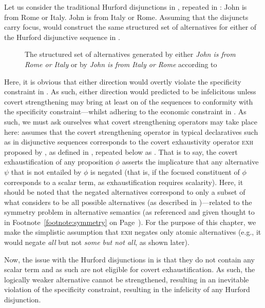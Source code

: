 Let us consider the traditional Hurford disjunctions in , repeated in :
\pex\label{ex:hurford-repeat1}
\a\ljudge{\#}John is from Rome or Italy.
\a\ljudge{\#}John is from Italy or Rome.
\xe
Assuming that the disjuncts carry focus, \textcite{Ippolito2020} would construct the same structured set of alternatives for either of the Hurford disjunctive sequence in .
\begin{figure}[!htb]
    \centering\hspace{-2cm}
    
    \caption{The structured set of alternatives generated by either \textit{John is from Rome or Italy} or by \textit{John is from Italy or Rome} according to \textcite{Ippolito2020}}
\end{figure}
Here, it is obvious that either direction would overtly violate the specificity constraint in . As such, either direction would predicted to be infelicitous unless covert strengthening may bring at least on of the sequences to conformity with the specificity constraint---whilst adhering to the economic constraint in . As such, we must ask ourselves what covert strengthening operators may take place here: \textcite{Ippolito2020} assumes that the covert strengthening operator in typical declaratives such as in disjunctive sequences corresponds to the covert exhaustivity operator {\scshape exh} proposed by \textcite{Chierchia2012}, as defined in , repeated below as .
\ex{}\xe
That is to say, the covert exhaustification of any proposition $\phi$ asserts the implicature that any alternative $\psi$ that is not entailed by $\phi$ is negated (that is, if the focused constituent of $\phi$ corresponds to a scalar term, as exhaustification requires scalarity). Here, it should be noted that the negated alternatives correspond to only a subset of what \textcite{Ippolito2020} considers to be all possible alternatives (as described in )---related to the symmetry problem in alternative semantics (as referenced and given thought to in Footnote~\ref{footnote:symmetry} on Page~\pageref{footnote:symmetry}). For the purpose of this chapter, we make the simplistic assumption that {\scshape exh} negates only atomic alternatives (e.g., it would negate \textit{all} but not \textit{some but not all}, as shown later).

Now, the issue with the Hurford disjunctions in  is that they do not contain any scalar term and as such are not eligible for covert exhaustification. As such, the logically weaker alternative cannot be strengthened, resulting in an inevitable violation of the specificity constraint, resulting in the infelicity of any Hurford disjunction.

